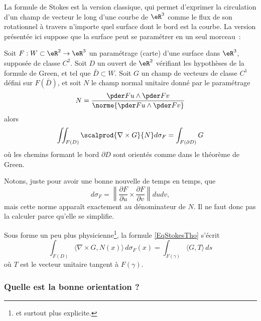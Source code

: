 La formule de Stokes est la version classique, qui permet d'exprimer la circulation d'un champ de vecteur le long d'une courbe de \( \eR^3\) comme le flux de son rotationnel à travers n'importe quel surface dont le bord est la courbe. La version présentée ici suppose que la surface peut se paramétrer en un seul morceau~:
\begin{theorem}      \label{THOooDCPKooMqNOMU}
	Soit \( F : W\subset \eR^2 \to \eR^3\) un paramétrage (carte) d'une surface dans \( \eR^3\), supposée de classe \( C^2\). Soit \( D\) un ouvert de \( \eR^2\) vérifiant les hypothèses de la formule de Green, et tel que \( \bar D \subset W\). Soit \( G\) un champ de vecteurs de classe \( C^1\) défini sur \( F(\bar D)\), et soit \( N\) le champ normal unitaire donné par le paramétrage
	\begin{equation}
		N = \frac{\pder F u \wedge \pder F v}{\norme{\pder F u \wedge \pder F v}}
	\end{equation}
	alors
	\begin{equation}\label{EqStokesTho}
		\iint_{F(D)} \scalprod{\nabla\times G}{N} d\sigma_F = \int_{F(\partial D)} G
	\end{equation}
	où les chemins formant le bord \( \partial D\) sont orientés comme dans le théorème de Green.
\end{theorem}
Notons, juste pour avoir une bonne nouvelle de temps en temps, que
\begin{equation}
	d\sigma_F=\left\| \frac{ \partial F }{ \partial u }\times\frac{ \partial F }{ \partial v }  \right\|dudv,
\end{equation}
mais cette norme apparaît exactement au dénominateur de \( N\). Il ne faut donc pas la calculer parce qu'elle se simplifie.

Sous forme un peu plus physicienne\footnote{et surtout plus explicite.}, la formule \eqref{EqStokesTho} s'écrit
\begin{equation}
	\int_{F(D)}\langle \nabla\times G, N(x)\rangle\, d\sigma_F(x)=\int_{F(\gamma)}\langle G, T\rangle\, ds
\end{equation}
où \( T\) est le vecteur unitaire tangent à \( F(\gamma)\).

\subsubsection{Quelle est la bonne orientation ?}

